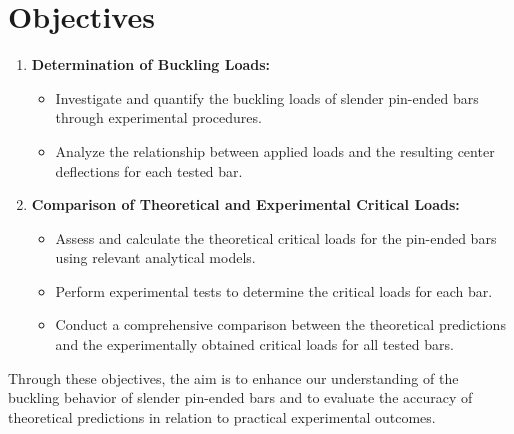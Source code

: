 \documentclass[12pt, titlepage]{article}
\begin{document}
\tableofcontents
\listoffigures
\listoftables
\thispagestyle{tocstyle}
\newpage
\section{Objectives}
\begin{enumerate}
    \item \textbf{Determination of Buckling Loads:}
    \begin{itemize}
        \item Investigate and quantify the buckling loads of slender pin-ended bars through experimental procedures.
        \item Analyze the relationship between applied loads and the resulting center deflections for each tested bar.
    \end{itemize}

    \item \textbf{Comparison of Theoretical and Experimental Critical Loads:}
    \begin{itemize}
        \item Assess and calculate the theoretical critical loads for the pin-ended bars using relevant analytical models.
        \item Perform experimental tests to determine the critical loads for each bar.
        \item Conduct a comprehensive comparison between the theoretical predictions and the experimentally obtained critical loads for all tested bars.
    \end{itemize}
\end{enumerate}

Through these objectives, the aim is to enhance our understanding of the
buckling behavior of slender pin-ended bars and to evaluate the accuracy of
theoretical predictions in relation to practical experimental outcomes.
\newpage
\end{document}
